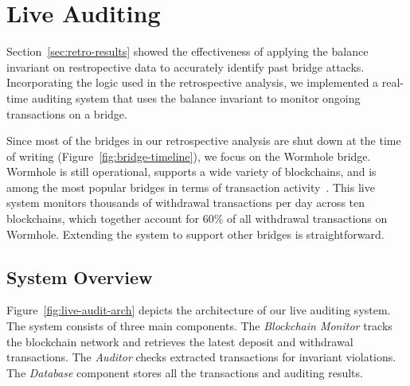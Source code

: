 \section{Live Auditing}
\label{sec:live-audit}

Section~\ref{sec:retro-results} showed the effectiveness of applying
the balance invariant on restropective data to accurately identify
past bridge attacks.  Incorporating the logic used in the
retrospective analysis, we implemented a real-time auditing system
that uses the balance invariant to monitor ongoing transactions on a
bridge.

Since most of the bridges in our retrospective analysis are shut down at
the time of writing (Figure~\ref{fig:bridge-timeline}), we focus on the
Wormhole bridge.  Wormhole is still operational, supports a wide
variety of blockchains, and is among the most popular bridges in terms
of transaction activity~\cite{zhang2023sok}.  This live system
monitors thousands of withdrawal transactions per day across ten
blockchains, which together account for 60\% of all withdrawal
transactions on Wormhole.  Extending the system to support other
bridges is straightforward.




\subsection{System Overview}

Figure~\ref{fig:live-audit-arch} depicts the architecture of our live
auditing system. The system consists of three main components. The
\textit{Blockchain Monitor} tracks the blockchain network and
retrieves the latest deposit and withdrawal transactions. The
\textit{Auditor} checks extracted transactions for invariant
violations. The \textit{Database} component stores all the
transactions and auditing results.


